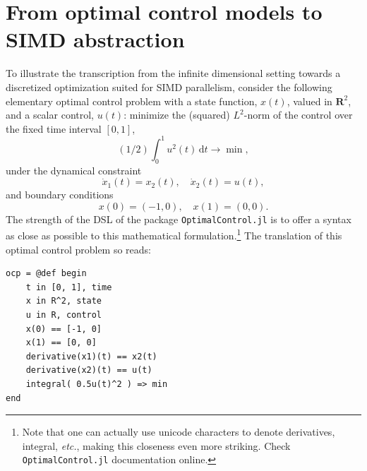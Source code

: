 \section{From optimal control models to SIMD abstraction}
To illustrate the transcription from the infinite dimensional setting towards a discretized optimization suited for SIMD parallelism, consider the following elementary optimal control problem with a state function, $x(t)$, valued in $\mathbf{R}^2$, and a scalar control, $u(t)$: minimize the (squared) $L^2$-norm of the control over the fixed time interval $[0,1]$,
$$ (1/2) \int_0^1 u^2(t)\,\mathrm{d}t \to \min, $$
under the dynamical constraint
$$ \dot{x}_1(t) = x_2(t),\quad \dot{x}_2(t) = u(t), $$
and boundary conditions
$$ x(0) = (-1, 0),\quad x(1) = (0,0). $$
The strength of the DSL of the package \texttt{OptimalControl.jl} is to offer a syntax as close as possible to this mathematical formulation.\footnote{Note that one can actually use unicode characters to denote derivatives, integral, \emph{etc.}, making this closeness even more striking. Check \texttt{OptimalControl.jl} documentation online.} The translation of this optimal control problem so reads:

\begin{verbatim}
ocp = @def begin
    t in [0, 1], time
    x in R^2, state
    u in R, control
    x(0) == [-1, 0]
    x(1) == [0, 0]
    derivative(x1)(t) == x2(t)
    derivative(x2)(t) == u(t)
    integral( 0.5u(t)^2 ) => min
end
\end{verbatim}

